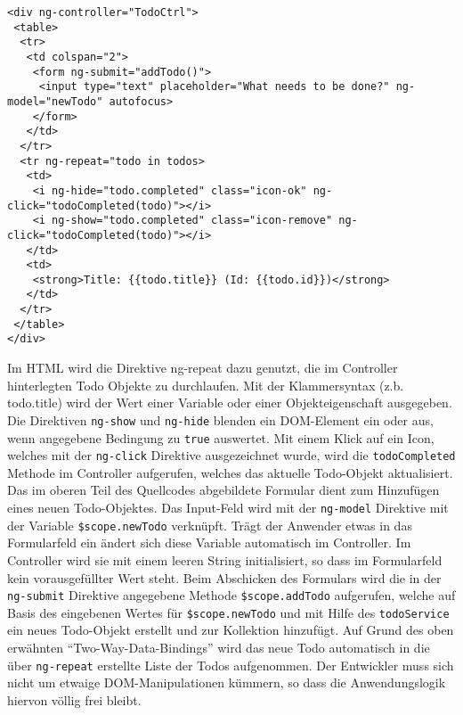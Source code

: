\begin{lstlisting}
<div ng-controller="TodoCtrl">
 <table>
  <tr>
   <td colspan="2">
    <form ng-submit="addTodo()">
     <input type="text" placeholder="What needs to be done?" ng-model="newTodo" autofocus>
    </form>
   </td>
  </tr>
  <tr ng-repeat="todo in todos>
   <td>
    <i ng-hide="todo.completed" class="icon-ok" ng-click="todoCompleted(todo)"></i>
    <i ng-show="todo.completed" class="icon-remove" ng-click="todoCompleted(todo)"></i>
   </td>
   <td>
    <strong>Title: {{todo.title}} (Id: {{todo.id}})</strong>
   </td>
  </tr>
 </table>
</div>
\end{lstlisting}
Im HTML wird die Direktive ng-repeat dazu genutzt, die im Controller hinterlegten Todo Objekte zu durchlaufen. Mit der Klammersyntax (z.b. {{todo.title}}) wird der Wert einer Variable oder einer Objekteigenschaft ausgegeben. Die Direktiven \texttt{ng-show} und \texttt{ng-hide} blenden ein DOM-Element ein oder aus, wenn angegebene Bedingung zu \texttt{true} auswertet. Mit einem Klick auf ein Icon, welches mit der \texttt{ng-click} Direktive ausgezeichnet wurde, wird die \texttt{todoCompleted} Methode im Controller aufgerufen, welches das aktuelle Todo-Objekt aktualisiert. Das im oberen Teil des Quellcodes abgebildete Formular dient zum Hinzufügen eines neuen Todo-Objektes. Das Input-Feld wird mit der \texttt{ng-model} Direktive mit der Variable \texttt{\$scope.newTodo} verknüpft. Trägt der Anwender etwas in das Formularfeld ein ändert sich diese Variable automatisch im Controller. Im Controller wird sie mit einem leeren String initialisiert, so dass im Formularfeld kein vorausgefüllter Wert steht. Beim Abschicken des Formulars wird die in der \texttt{ng-submit} Direktive angegebene Methode \texttt{\$scope.addTodo} aufgerufen, welche auf Basis des eingebenen Wertes für \texttt{\$scope.newTodo} und mit Hilfe des \texttt{todoService} ein neues Todo-Objekt erstellt und zur Kollektion hinzufügt. Auf Grund des oben erwähnten "`Two-Way-Data-Bindings"' wird das neue Todo automatisch in die über \texttt{ng-repeat} erstellte Liste der Todos aufgenommen. Der Entwickler muss sich nicht um etwaige DOM-Manipulationen kümmern, so dass die Anwendungslogik hiervon völlig frei bleibt.

